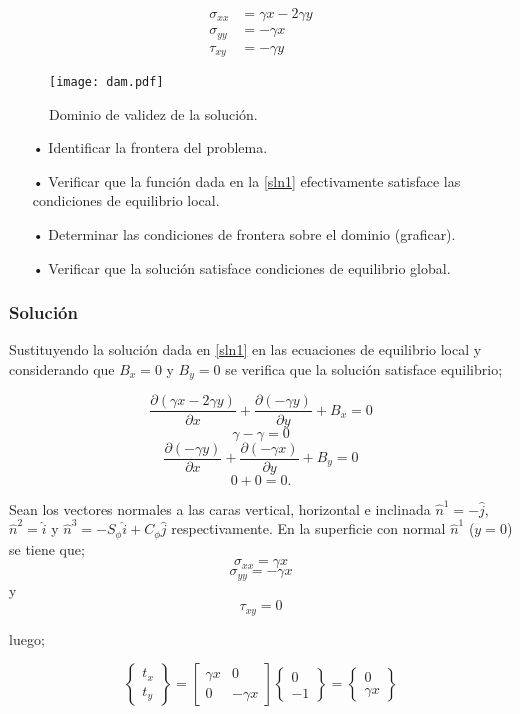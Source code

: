 \documentclass[../notas medios.tex]{subfiles}
\begin{document}
\begin{equation}
\begin{split}
{\sigma _{xx}} & = \gamma x - 2\gamma y \\
{\sigma _{yy}} & =  - \gamma x \\
{\tau _{xy}}   & =  - \gamma y
\end{split}
\label{sln1}
\end{equation}

\begin{figure}[H]
\centering
	\texttt{[image: dam.pdf]}
	\caption{Dominio de validez de la solución.}
	\label{dam}
\end{figure}


\begin{itemize}
\item[•] Identificar la frontera del problema.
\item[•] Verificar que la función dada en la \cref{sln1} efectivamente satisface las condiciones de equilibrio local.
\item[•] Determinar las condiciones de frontera sobre el dominio (graficar).
\item[•] Verificar que la solución satisface condiciones de equilibrio global.
\end{itemize}


\subsubsection*{Solución}
Sustituyendo la solución dada en \cref{sln1} en las ecuaciones de equilibrio local y considerando que $B_x =0$ y $B_y =0$ se verifica que la solución satisface equilibrio;

\[\frac{{\partial (\gamma x - 2\gamma y)}}{{\partial x}} + \frac{{\partial ( - \gamma y)}}{{\partial y}} + {B_x} = 0\]
\[\gamma  - \gamma  = 0\] 
\[\frac{{\partial ( - \gamma y)}}{{\partial x}} + \frac{{\partial ( - \gamma x)}}{{\partial y}} + {B_y} = 0\]
\[0 + 0 = 0.\]

Sean los vectores normales a las caras vertical, horizontal e inclinada ${{\hat n}^1} =  - \hat j$, ${{\hat n}^2} =   \hat i$ y ${{\hat n}^3} =  - {S_\phi }\hat i + {C_\phi }\hat j$ respectivamente. En la superficie con normal ${{\hat n}^1}$ ($y=0$) se tiene que;
\[{\sigma _{xx}} = \gamma x\]
\[{\sigma _{yy}} =  - \gamma x\]
y
\[{\tau _{xy}} = 0 \]

luego;

\[\left\{ {\begin{array}{*{20}{c}}
{{t_x}}\\
{{t_y}}
\end{array}} \right\} = \left[ {\begin{array}{*{20}{c}}
{\gamma x}&0\\
0&{ - \gamma x}
\end{array}} \right]\left\{ {\begin{array}{*{20}{c}}
0\\
{ - 1}
\end{array}} \right\} = \left\{ {\begin{array}{*{20}{c}}
0\\
{\gamma x}
\end{array}} \right\}\]
\end{document}
